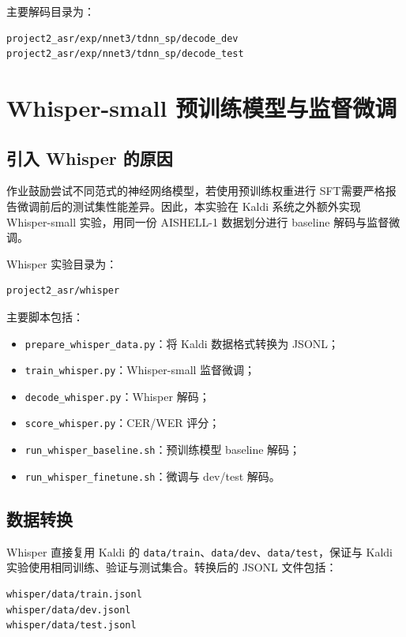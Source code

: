 \documentclass[UTF8,a4paper,12pt]{ctexart}
\begin{document}
主要解码目录为：

\begin{lstlisting}
project2_asr/exp/nnet3/tdnn_sp/decode_dev
project2_asr/exp/nnet3/tdnn_sp/decode_test
\end{lstlisting}

\section{Whisper-small 预训练模型与监督微调}

\subsection{引入 Whisper 的原因}

作业鼓励尝试不同范式的神经网络模型，若使用预训练权重进行 SFT需要严格报告微调前后的测试集性能差异。因此，本实验在 Kaldi 系统之外额外实现 Whisper-small 实验，用同一份 AISHELL-1 数据划分进行 baseline 解码与监督微调。

Whisper 实验目录为：

\begin{lstlisting}
project2_asr/whisper
\end{lstlisting}

主要脚本包括：

\begin{itemize}
  \item \texttt{prepare\_whisper\_data.py}：将 Kaldi 数据格式转换为 JSONL；
  \item \texttt{train\_whisper.py}：Whisper-small 监督微调；
  \item \texttt{decode\_whisper.py}：Whisper 解码；
  \item \texttt{score\_whisper.py}：CER/WER 评分；
  \item \texttt{run\_whisper\_baseline.sh}：预训练模型 baseline 解码；
  \item \texttt{run\_whisper\_finetune.sh}：微调与 dev/test 解码。
\end{itemize}

\subsection{数据转换}

Whisper 直接复用 Kaldi 的 \texttt{data/train}、\texttt{data/dev}、\texttt{data/test}，保证与 Kaldi 实验使用相同训练、验证与测试集合。转换后的 JSONL 文件包括：

\begin{lstlisting}
whisper/data/train.jsonl
whisper/data/dev.jsonl
whisper/data/test.jsonl
\end{lstlisting}
\end{document}
